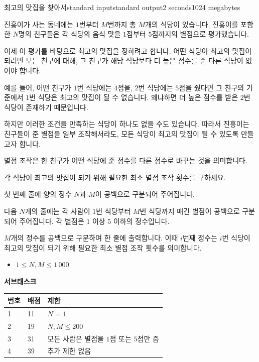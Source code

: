 \begin{problem}{최고의 맛집을 찾아서}{standard input}{standard output}{2 seconds}{1024 megabytes}

진흥이가 사는 동네에는 $1$번부터 $M$번까지 총 $M$개의 식당이 있습니다.
진흥이를 포함한 $N$명의 친구들은 각 식당의 음식 맛을 $1$점부터 $5$점까지의 별점으로 평가했습니다.

이제 이 평가를 바탕으로 최고의 맛집을 정하려고 합니다.
어떤 식당이 최고의 맛집이 되려면 모든 친구에 대해, 그 친구가 해당 식당보다 더 높은 점수를 준 다른 식당이 없어야 합니다.

예를 들어, 어떤 친구가 $1$번 식당에는 $4$점을, $2$번 식당에는 $5$점을 줬다면
그 친구의 기준에서 $1$번 식당은 최고의 맛집이 될 수 없습니다. 왜냐하면 더 높은 점수를 받은 $2$번 식당이 존재하기 때문입니다.

하지만 이러한 조건을 만족하는 식당이 하나도 없을 수도 있습니다.
따라서 진흥이는 친구들이 준 별점을 일부 조작해서라도,
모든 식당이 최고의 맛집이 될 수 있도록 만들고자 합니다.

별점 조작은 한 친구가 어떤 식당에 준 점수를 다른 점수로 바꾸는 것을 의미합니다.

각 식당이 최고의 맛집이 되기 위해 필요한 최소 별점 조작 횟수를 구하세요.

\InputFile
첫 번째 줄에 양의 정수 $N$과 $M$이 공백으로 구분되어 주어집니다.

다음 $N$개의 줄에는 각 사람이 $1$번 식당부터 $M$번 식당까지 매긴 별점이 공백으로 구분되어 주어집니다. 각 별점은 $1$ 이상 $5$ 이하의 정수입니다.

\OutputFile
$M$개의 정수를 공백으로 구분하여 한 줄에 출력합니다.
이때 $i$번째 정수는 $i$번 식당이 최고의 맛집이 되기 위해 필요한 최소 별점 조작 횟수를 의미합니다.

\Scoring
\begin{itemize}
\item $1 \le N, M \le 1\,000$
\end{itemize}

\textbf{서브태스크}
\begin{tabular}{|l|l|l|} \hline
  \textbf{번호} & \textbf{배점} & \textbf{제한} \\ \hline
  1 & 11 & $N = 1$ \\ \hline
  2 & 19 & $N, M \le 200$ \\ \hline
  3 & 31 & 모든 사람은 별점을 $1$점 또는 $5$점만 줌 \\ \hline
  4 & 39 & 추가 제한 없음 \\ \hline
\end{tabular}

\Example

\begin{example}
%
\end{example}

\end{problem}

